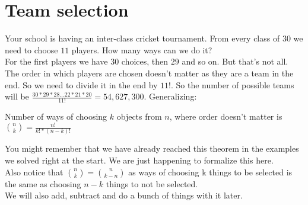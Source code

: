 \section{Team selection}
Your school is having an inter-class cricket tournament. From every class of $30$ we need to choose $11$ players. How many ways can we do it?\\
For the first players we have $30$ choices, then $29$ and so on. But that's not all. The order in which players are chosen doesn't matter as they are a team in the end. So we need to divide it in the end by $11!$. So the number of possible teams will be $\frac{30*29*28 \dots 22*21 *20}{11!}=54,627,300$. Generalizing:\\
\begin{theorem}
    Number of ways of choosing $k$ objects from $n$, where order doesn't matter is $\binom{n}{k}=\frac{n!}{k!*(n-k)!}$
\end{theorem}
You might remember that we have already reached this theorem in the examples we solved right at the start. We are just happening to formalize this here.\\
Also notice that $\binom{n}{k}=\binom{n}{k-n}$ as ways of choosing k things to be selected is the same as choosing $n-k$ things to not be selected.\\
We will also add, subtract and do a bunch of things with it later.\\
